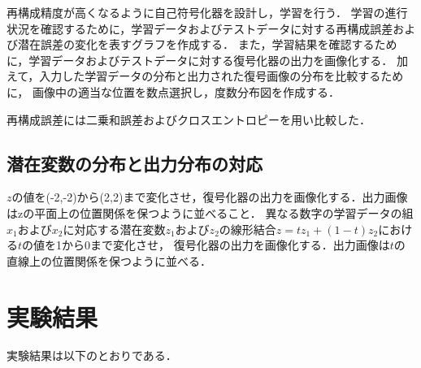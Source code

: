 \documentclass[12pt]{jsarticle}
\begin{document}
再構成精度が高くなるように自己符号化器を設計し，学習を行う．
学習の進行状況を確認するために，学習データおよびテストデータに対する再構成誤差および潜在誤差の変化を表すグラフを作成する．
また，学習結果を確認するために，学習データおよびテストデータに対する復号化器の出力を画像化する．
加えて，入力した学習データの分布と出力された復号画像の分布を比較するために，
画像中の適当な位置を数点選択し，度数分布図を作成する．

再構成誤差には二乗和誤差およびクロスエントロピーを用い比較した．



\subsection{潜在変数の分布と出力分布の対応}

$z$の値を(-2,-2)から(2,2)まで変化させ，復号化器の出力を画像化する．出力画像はzの平面上の位置関係を保つように並べること．
異なる数字の学習データの組$x_1$および$x_2$に対応する潜在変数$z_1$および$z_2$の線形結合$z=t z_1+(1-t) z_2$における$t$の値を1から0まで変化させ，
復号化器の出力を画像化する．出力画像は$t$の直線上の位置関係を保つように並べる．



\section{実験結果}

実験結果は以下のとおりである．
\end{document}
